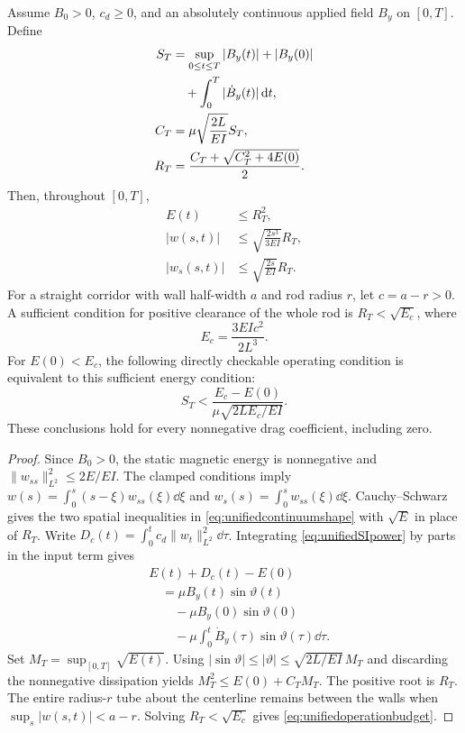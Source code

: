 \begin{proposition}
\label{prop:unifiedvariation}
Assume $B_0>0$, $c_d\geq0$, and an absolutely continuous applied field
$B_y$ on $[0,T]$.  Define
\begin{align}
 S_T&=\sup_{0\leq t\leq T}|B_y(t)|+|B_y(0)|\notag\\
    &\quad+\int_0^T|\dot B_y(t)|\,\mathrm d t,\\
 C_T&=\mu\sqrt{\frac{2L}{EI}}S_T,
 \\
 R_T&=\frac{C_T+\sqrt{C_T^2+4E(0)}}{2}.
 \label{eq:unifiedvariationbudget}
\end{align}
Then, throughout $[0,T]$,
\begin{equation}
 \begin{aligned}
 E(t)&\leq R_T^2,\\
 |w(s,t)|&\leq\sqrt{\frac{2s^3}{3EI}}R_T,\\
 |w_s(s,t)|&\leq\sqrt{\frac{2s}{EI}}R_T.
 \end{aligned}
 \label{eq:unifiedcontinuumshape}
\end{equation}
For a straight corridor with wall half-width $a$ and rod radius $r$, let
$c=a-r>0$.  A sufficient condition for positive clearance of the whole
rod is $R_T<\sqrt{E_c}$, where
\begin{equation}
 E_c=\frac{3EIc^2}{2L^3}.
 \label{eq:unifiedclearanceenergy}
\end{equation}
For $E(0)<E_c$, the following directly checkable operating condition is
equivalent to this sufficient energy condition:
\begin{equation}
 S_T<\frac{E_c-E(0)}{\mu\sqrt{2LE_c/EI}}.
 \label{eq:unifiedoperationbudget}
\end{equation}
These conclusions hold for every nonnegative drag coefficient, including zero.
\end{proposition}

\begin{proof}
Since $B_0>0$, the static magnetic energy is nonnegative and
$\|w_{ss}\|_{L^2}^2\leq2E/EI$.
The clamped conditions imply
$w(s)=\int_0^s(s-\xi)w_{ss}(\xi)\dd\xi$ and
$w_s(s)=\int_0^s w_{ss}(\xi)\dd\xi$.
Cauchy--Schwarz gives the two spatial inequalities in
\eqref{eq:unifiedcontinuumshape} with $\sqrt E$ in place of $R_T$.
Write $D_c(t)=\int_0^t c_d\|w_t\|_{L^2}^2\dd\tau$.
Integrating \eqref{eq:unifiedSIpower} by parts in the input term gives
\begin{align*}
 &E(t)+D_c(t)-E(0)\\
 &\quad=\mu B_y(t)\sin\vartheta(t)\\
 &\qquad-\mu B_y(0)\sin\vartheta(0)\\
 &\qquad-\mu\int_0^t\dot B_y(\tau)\sin\vartheta(\tau)\dd\tau.
\end{align*}
Set $M_T=\sup_{[0,T]}\sqrt{E(t)}$.
Using $|\sin\vartheta|\leq|\vartheta|
\leq\sqrt{2L/EI}\,M_T$ and discarding the nonnegative dissipation yields
$M_T^2\leq E(0)+C_TM_T$.
The positive root is $R_T$.
The entire radius-$r$ tube about the centerline remains between the walls
when $\sup_s|w(s,t)|<a-r$.
Solving $R_T<\sqrt{E_c}$ gives
\eqref{eq:unifiedoperationbudget}.
\end{proof}

